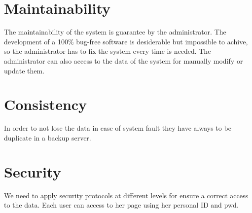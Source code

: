 \section{Maintainability}
The maintainability of the system is guarantee by the administrator. The development of a 100\% bug-free software is desiderable but impossible to achive, so the administrator has to fix the system every time is needed. The administrator can also access to the data of the system for manually modify or update them.

\section{Consistency}
In order to not lose the data in case of system fault they have always to be duplicate in a backup server.  

\section{Security}
We need to apply security protocols at different levels for ensure a correct access to the data. Each user can access to her page using her personal \gls{ID} and \gls{pwd}.

